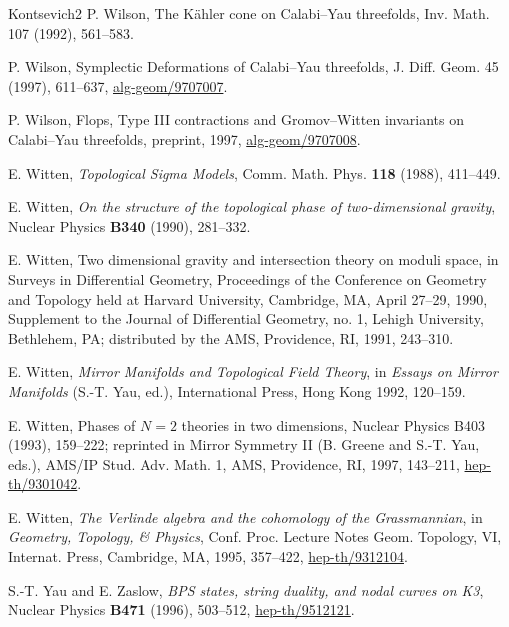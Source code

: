 \begin{thebibliography}{Kontsevich2}
\hypertarget{bib:Wilson2}{}
P. Wilson, The Kähler cone on Calabi--Yau threefolds,
Inv. Math. 107 (1992), 561--583.

\hypertarget{bib:Wilson3}{}
P. Wilson, Symplectic Deformations of Calabi--Yau threefolds, J. Diff. Geom. 45 (1997), 611--637, \href{https://arxiv.org/abs/alg-geom/9707007}{alg-geom/9707007}.

\hypertarget{bib:Wilson4}{}
P. Wilson, Flops, Type III contractions and Gromov--Witten invariants on Calabi--Yau threefolds, preprint, 1997, \href{https://arxiv.org/abs/alg-geom/9707008}{alg-geom/9707008}.

\hypertarget{bib:Witten1}{} E. Witten, \emph{Topological Sigma Models}, Comm. Math. Phys. \textbf{118} (1988), 411--449.

\hypertarget{bib:Witten2}{} E. Witten, \emph{On the structure of the topological phase of two-dimensional gravity}, Nuclear Physics \textbf{B340} (1990), 281--332.

\hypertarget{bib:Witten3}{}
E. Witten, Two dimensional gravity and intersection theory on moduli space, in Surveys in Differential Geometry, Proceedings of the Conference on Geometry and Topology held at Harvard University, Cambridge, MA, April 27--29, 1990, Supplement to the Journal of Differential Geometry, no. 1, Lehigh University, Bethlehem, PA; distributed by the AMS, Providence, RI, 1991, 243--310.


\hypertarget{bib:Witten4}{} E. Witten, \emph{Mirror Manifolds and Topological Field Theory}, in \emph{Essays on Mirror Manifolds} (S.-T. Yau, ed.), International Press, Hong Kong 1992, 120--159.

\hypertarget{bib:Witten5}{}
E. Witten, Phases of \(N=2\) theories in two dimensions,
Nuclear Physics B403 (1993), 159--222;
reprinted in Mirror Symmetry II (B. Greene and S.-T. Yau, eds.),
AMS/IP Stud. Adv. Math. 1, AMS, Providence, RI, 1997, 143--211,
\href{https://arxiv.org/abs/hep-th/9301042}{hep-th/9301042}.

\hypertarget{bib:Witten6}{} E. Witten, \emph{The Verlinde algebra and the cohomology of the Grassmannian}, in \emph{Geometry, Topology, \& Physics}, Conf. Proc. Lecture Notes Geom. Topology, VI, Internat. Press, Cambridge, MA, 1995, 357--422, \href{https://arxiv.org/abs/hep-th/9312104}{hep-th/9312104}.

\hypertarget{bib:YZ}{} S.-T. Yau and E. Zaslow, \emph{BPS states, string duality, and nodal curves on K3}, Nuclear Physics \textbf{B471} (1996), 503--512, \href{https://arxiv.org/abs/hep-th/9512121}{hep-th/9512121}.
\end{thebibliography}
